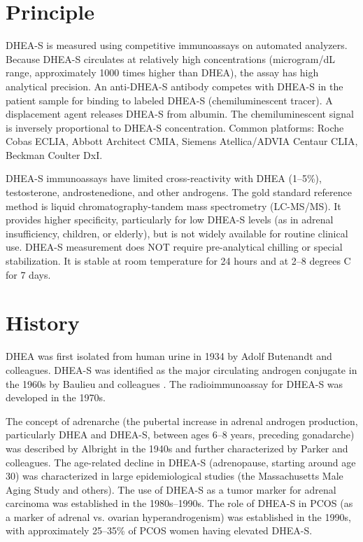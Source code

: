 \section*{Principle}
DHEA-S is measured using competitive immunoassays on automated analyzers. Because DHEA-S circulates at relatively high concentrations (microgram/dL range, approximately 1000 times higher than DHEA), the assay has high analytical precision. An anti-DHEA-S antibody competes with DHEA-S in the patient sample for binding to labeled DHEA-S (chemiluminescent tracer). A displacement agent releases DHEA-S from albumin. The chemiluminescent signal is inversely proportional to DHEA-S concentration. Common platforms: Roche Cobas ECLIA, Abbott Architect CMIA, Siemens Atellica/ADVIA Centaur CLIA, Beckman Coulter DxI.

DHEA-S immunoassays have limited cross-reactivity with DHEA (1--5\%), testosterone, androstenedione, and other androgens. The gold standard reference method is liquid chromatography-tandem mass spectrometry (LC-MS/MS). It provides higher specificity, particularly for low DHEA-S levels (as in adrenal insufficiency, children, or elderly), but is not widely available for routine clinical use. DHEA-S measurement does NOT require pre-analytical chilling or special stabilization. It is stable at room temperature for 24 hours and at 2--8 degrees C for 7 days.

\section*{History}
DHEA was first isolated from human urine in 1934 by Adolf Butenandt and colleagues. DHEA-S was identified as the major circulating androgen conjugate in the 1960s by Baulieu and colleagues \cite{baulieu1965adrenalsecreted}. The radioimmunoassay for DHEA-S was developed in the 1970s.

The concept of adrenarche (the pubertal increase in adrenal androgen production, particularly DHEA and DHEA-S, between ages 6--8 years, preceding gonadarche) was described by Albright in the 1940s and further characterized by Parker and colleagues. The age-related decline in DHEA-S (adrenopause, starting around age 30) was characterized in large epidemiological studies (the Massachusetts Male Aging Study and others). The use of DHEA-S as a tumor marker for adrenal carcinoma was established in the 1980s--1990s. The role of DHEA-S in PCOS (as a marker of adrenal vs. ovarian hyperandrogenism) was established in the 1990s, with approximately 25--35\% of PCOS women having elevated DHEA-S.


